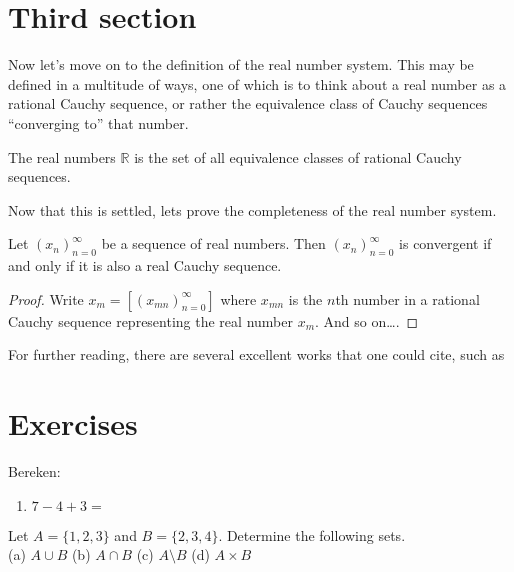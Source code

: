 \documentclass{tstextbook}
\begin{document}
\section{Third section}

Now let's move on to the definition of the real number system. This
may be defined in a multitude of ways, one of which is to think about
a real number as a rational Cauchy sequence, or rather the equivalence
class of Cauchy sequences ``converging to'' that number.

\begin{definition}
  \label{def:realnumbers}
  The real numbers $\mathbb{R}$ is the set of all equivalence classes
  of rational Cauchy sequences.
\end{definition}

Now that this is settled, lets prove the completeness of the real
number system.

\begin{theorem}
  \label{th:realnumberscomplete}
  Let $(x_n)_{n=0}^{\infty}$ be a sequence of real numbers.
  Then $(x_n)_{n=0}^{\infty}$ is convergent if and only if
  it is also a real Cauchy sequence.
  \end{theorem}
\begin{proof}
  Write $x_m = [(x_{mn})_{n=0}^{\infty}]$ where
  $x_{mn}$ is the $n$th number in a rational Cauchy sequence
  representing the real number $x_m$. And so on\ldots.
\end{proof}

For further reading, there are several excellent works that one could
cite, such as 

\section*{Exercises}

\begin{exercise}
    Bereken:
    \begin{enumerate}
     \item $7 - 4 + 3 = $
    \end{enumerate}
  Let $A = \{1, 2, 3\}$ and $B = \{2, 3, 4\}$.
  Determine the following sets. \\
  (a) $A \cup B$ \quad
  (b) $A \cap B$ \quad
  (c) $A \setminus B$ \quad
  (d) $A \times B$
\end{exercise}
\end{document}
